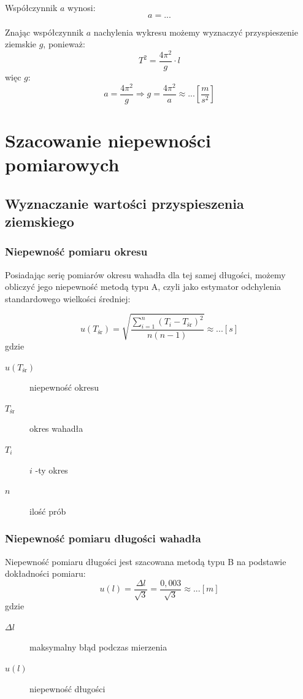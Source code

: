 \documentclass [a4paper,11pt]{article}
\begin{document}
\indent Współczynnik $a$ wynosi:
\begin{equation}
a = ...
\end{equation}

Znając współczynnik $a$ nachylenia wykresu możemy wyznaczyć przyspieszenie ziemskie $g$,
ponieważ: 
\begin{equation}
	T^2 = \frac{4 \pi^2}{g}\cdot l  
\end{equation} 
więc $g$:
\begin{equation}
	 a =   \frac{4 \pi^2}{g} \Longrightarrow g= \frac{4 \pi^2}{a}  \approx ... \left[ \frac{m}{s^2}\right]  
\end{equation}
	  

\newpage

\section{Szacowanie niepewności pomiarowych}
\subsection{Wyznaczanie wartości przyspieszenia ziemskiego}
\subsubsection{Niepewność pomiaru okresu}
\indent Posiadając serię pomiarów okresu wahadła dla tej samej długości, możemy obliczyć jego niepewność metodą typu A, czyli jako estymator odchylenia standardowego wielkości średniej:

\begin{equation}
u(T_{\text{śr}})  = \sqrt{\frac{\sum_{i=1}^{n} \left(T_i - T_{\text{śr}}\right)^2}{n(n-1)}} \approx ... [s]
\end{equation}  
gdzie
\begin{description}
\item [$u(T_{\text{śr}})$] niepewność okresu
\item [$T_{\text{śr}}$] okres wahadła
\item [$T_{i}$] $i$ -ty okres
\item [$n$] ilość prób 
\end{description}

\subsubsection{Niepewność pomiaru długości wahadła}
\indent Niepewność pomiaru długości jest szacowana metodą typu B na podstawie dokładności pomiaru:
\begin{equation}
u(l) = \frac{\Delta l}{\sqrt{3}} = \frac{0,003}{\sqrt{3}} \approx ... [m] 
\end{equation}
gdzie
\begin{description}
\item [$ \Delta l $] maksymalny błąd podczas mierzenia
\item [$u(l)$] niepewność długości
\end{description}
\end{document}
